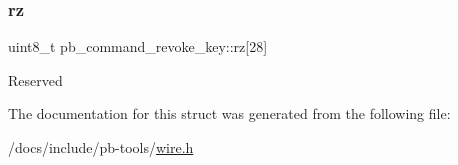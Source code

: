 \subsubsection{\texorpdfstring{rz}{rz}}
{\footnotesize\ttfamily uint8\+\_\+t pb\+\_\+command\+\_\+revoke\+\_\+key\+::rz\mbox{[}28\mbox{]}}

Reserved 

The documentation for this struct was generated from the following file\+:\begin{DoxyCompactItemize}
\item 
/docs/include/pb-\/tools/\hyperlink{wire_8h}{wire.\+h}\end{DoxyCompactItemize}

